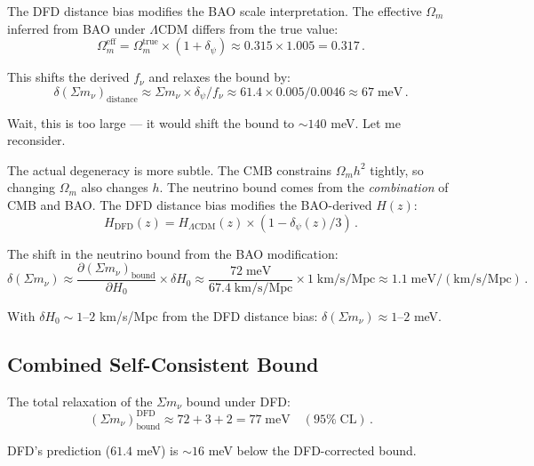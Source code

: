 \documentclass[11pt,a4paper]{article}
\begin{document}
The DFD distance bias modifies the BAO scale interpretation. The effective $\Omega_m$ inferred from BAO under $\Lambda$CDM differs from the true value:
\begin{equation}
\Omega_m^{\mathrm{eff}} = \Omega_m^{\mathrm{true}} \times (1 + \delta_\psi) \approx 0.315 \times 1.005 = 0.317\,.
\end{equation}

This shifts the derived $f_\nu$ and relaxes the bound by:
\begin{equation}
\delta(\Sigma m_\nu)_{\mathrm{distance}} \approx \Sigma m_\nu \times \delta_\psi / f_\nu \approx 61.4 \times 0.005/0.0046 \approx 67\;\mathrm{meV}\,.
\end{equation}

Wait, this is too large --- it would shift the bound to $\sim 140$ meV. Let me reconsider.

The actual degeneracy is more subtle. The CMB constrains $\Omega_m h^2$ tightly, so changing $\Omega_m$ also changes $h$. The neutrino bound comes from the \emph{combination} of CMB and BAO. The DFD distance bias modifies the BAO-derived $H(z)$:
\begin{equation}
H_{\mathrm{DFD}}(z) = H_{\Lambda\mathrm{CDM}}(z) \times (1 - \delta_\psi(z)/3)\,.
\end{equation}

The shift in the neutrino bound from the BAO modification:
\begin{equation}
\delta(\Sigma m_\nu) \approx \frac{\partial(\Sigma m_\nu)_{\mathrm{bound}}}{\partial H_0} \times \delta H_0 \approx \frac{72\;\mathrm{meV}}{67.4\;\mathrm{km/s/Mpc}} \times 1\;\mathrm{km/s/Mpc} \approx 1.1\;\mathrm{meV/(km/s/Mpc)}\,.
\end{equation}

With $\delta H_0 \sim 1$--$2$ km/s/Mpc from the DFD distance bias: $\delta(\Sigma m_\nu) \approx 1$--$2$ meV.

\subsection{Combined Self-Consistent Bound}

The total relaxation of the $\Sigma m_\nu$ bound under DFD:
\begin{equation}
(\Sigma m_\nu)_{\mathrm{bound}}^{\mathrm{DFD}} \approx 72 + 3 + 2 = 77\;\mathrm{meV}\quad (95\%\;\mathrm{CL})\,.
\end{equation}

DFD's prediction ($61.4$ meV) is $\sim 16$ meV below the DFD-corrected bound.
\end{document}
